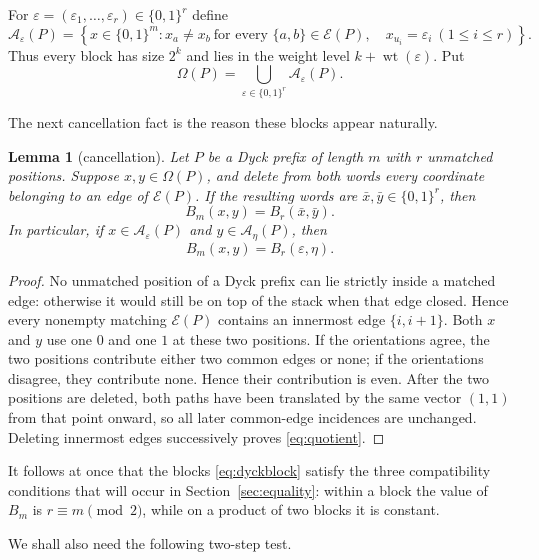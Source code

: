 \documentclass[11pt]{article}
\newtheorem{lemma}[theorem]{Lemma}
\theoremstyle{definition}
\newcommand{\wt}{\operatorname{wt}}
\newcommand{\A}{\mathcal A}
\newcommand{\E}{\mathcal E}
\newcommand{\Om}{\Omega}
\newcommand{\bits}{\{0,1\}}
\newcommand{\eps}{\varepsilon}
\begin{document}
For $\eps=(\eps_1,\ldots,\eps_r)\in\bits^r$ define
\begin{equation}\label{eq:dyckblock}
 \A_{\eps}(P)=
 \left\{x\in\bits^m:
   x_a\ne x_b\ \text{for every }\{a,b\}\in\E(P),\quad
   x_{u_i}=\eps_i\ (1\le i\le r)
 \right\}.
\end{equation}
Thus every block has size $2^k$ and lies in the weight level $k+\wt(\eps)$.  Put
\[
 \Om(P)=\bigcup_{\eps\in\bits^r}\A_{\eps}(P).
\]

The next cancellation fact is the reason these blocks appear naturally.

\begin{lemma}[cancellation]\label{lem:cancellation}
Let $P$ be a Dyck prefix of length $m$ with $r$ unmatched positions.  Suppose $x,y\in\Om(P)$, and delete from both words every coordinate belonging to an edge of $\E(P)$.  If the resulting words are $\bar x,\bar y\in\bits^r$, then
\begin{equation}\label{eq:quotient}
 B_m(x,y)=B_r(\bar x,\bar y).
\end{equation}
In particular, if $x\in\A_{\eps}(P)$ and $y\in\A_{\eta}(P)$, then
\begin{equation}\label{eq:blockkernel}
 B_m(x,y)=B_r(\eps,\eta).
\end{equation}
\end{lemma}

\begin{proof}
No unmatched position of a Dyck prefix can lie strictly inside a matched edge: otherwise it would still be on top of the stack when that edge closed.  Hence every nonempty matching $\E(P)$ contains an innermost edge $\{i,i+1\}$.  Both $x$ and $y$ use one $0$ and one $1$ at these two positions.  If the orientations agree, the two positions contribute either two common edges or none; if the orientations disagree, they contribute none.  Hence their contribution is even.  After the two positions are deleted, both paths have been translated by the same vector $(1,1)$ from that point onward, so all later common-edge incidences are unchanged.  Deleting innermost edges successively proves \eqref{eq:quotient}.
\end{proof}

It follows at once that the blocks \eqref{eq:dyckblock} satisfy the three compatibility conditions that will occur in Section~\ref{sec:equality}: within a block the value of $B_m$ is $r\equiv m\pmod2$, while on a product of two blocks it is constant.

We shall also need the following two-step test.
\end{document}
